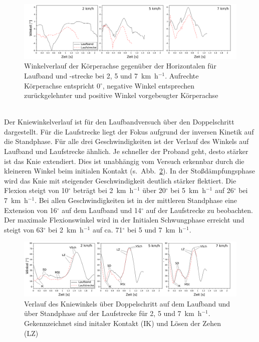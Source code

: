 \begin{figure}[h!]
	\centering
	\includegraphics[width=\linewidth]{bilder/Ergebnisse/compare_trunk}
	\caption[Winkelverlauf der Körperachse auf Laufband und -strecke]{Winkelverlauf der Körperachse gegenüber der Horizontalen für Laufband und -strecke bei 2, 5 und 7~km~h$^{-1}$. Aufrechte Körperachse entspricht 0$^{\circ}$, negative Winkel entsprechen zurückgelehnter und positive Winkel vorgebeugter Körperachse}
	\label{fig:res_compare_trunk}
\end{figure}\\
Der Kniewinkelverlauf ist für den Laufbandversuch über den Doppelschritt dargestellt. Für die Laufstrecke liegt der Fokus aufgrund der inversen Kinetik auf die Standphase. Für alle drei Geschwindigkeiten ist der Verlauf des Winkels auf Laufband und Laufstrecke ähnlich. Je schneller der Proband geht, desto stärker ist das Knie extendiert. Dies ist unabhängig vom Versuch erkennbar durch die kleineren Winkel beim initialen Kontakt (s.~Abb.~\ref{fig:comp_knee_angle}). In der Stoßdämpfungsphase wird das Knie mit steigender Geschwindigkeit deutlich stärker flektiert. Die Flexion steigt von 10$^{\circ}$ beträgt bei 2~km~h$^{-1}$ über 20$^{\circ}$ bei 5~km~h$^{-1}$ auf 26$^{\circ}$ bei 7~km~h$^{-1}$. Bei allen Geschwindigkeiten ist in der mittleren Standphase eine Extension von 16$^{\circ}$ auf dem Laufband und 14$^{\circ}$ auf der Laufstrecke zu beobachten. Der maximale Flexionswinkel wird in der Initialen Schwungphase erreicht und steigt von 63$^{\circ}$ bei 2~km~h$^{-1}$ auf ca. 71$^{\circ}$ bei 5 und 7~km~h$^{-1}$.\\ 
\begin{figure}[h!]
	\centering
	\includegraphics[width=\linewidth]{bilder/Ergebnisse/compare_knee_angle_3_speeds}
	\caption{Verlauf des Kniewinkels über Doppelschritt auf dem Laufband und über Standphase auf der Laufstrecke für 2, 5 und 7~km~h$^{-1}$. Gekennzeichnet sind initaler Kontakt (IK) und Lösen der Zehen (LZ)}
	\label{fig:comp_knee_angle}
\end{figure}
